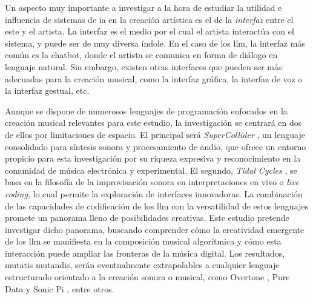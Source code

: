   
  
  
  
  


Un aspecto muy importante a investigar a la hora de estudiar la utilidad e influencia de sistemas de \gls{ia} en la creación artística es el de la \emph{interfaz} entre el este y el artista. La interfaz es el medio por el cual el artista interactúa con el sistema, y puede ser de muy diversa índole. En el caso de los \gls{llm}, la interfaz más común es la {chatbot}, donde el artista se comunica en forma de diálogo en lenguaje natural. Sin embargo, existen otras interfaces que pueden ser más adecuadas para la creación musical, como la interfaz gráfica, la interfaz de voz o la interfaz gestual, etc.

Aunque se dispone de numerosos lenguajes de programación enfocados en la creación musical relevantes para este estudio, la investigación se centrará en dos de ellos por limitaciones de espacio. El principal será \emph{SuperCollider} \citep{SuperCollider2024}, un lenguaje consolidado para síntesis sonora y procesamiento de audio, que ofrece un entorno propicio para esta investigación por su riqueza expresiva y reconocimiento en la comunidad de música electrónica y experimental. El segundo, \emph{Tidal Cycles} \citep{TidalCycles}, se basa en la filosofía de la improvisación sonora en interpretaciones en vivo o \emph{live coding}, lo cual permite la exploración de interfaces innovadoras. La combinación de las capacidades de codificación de los \gls{llm} con la versatilidad de estos lenguajes promete un panorama lleno de posibilidades creativas. Este estudio pretende investigar dicho panorama, buscando comprender cómo la creatividad emergente de los \gls{llm} se manifiesta en la composición musical algorítmica y cómo esta interacción puede ampliar las fronteras de la música digital. Los resultados, mutatis mutandis, serán eventualmente extrapolables a cualquier lenguaje estructurado orientado a la creación sonora o musical, como {Overtone} \citep{OvertoneCollaborativeProgrammable}, {Pure Data} \citep{PureDataPd} y {Sonic Pi} \citep{SonicPiLive}, entre otros.

